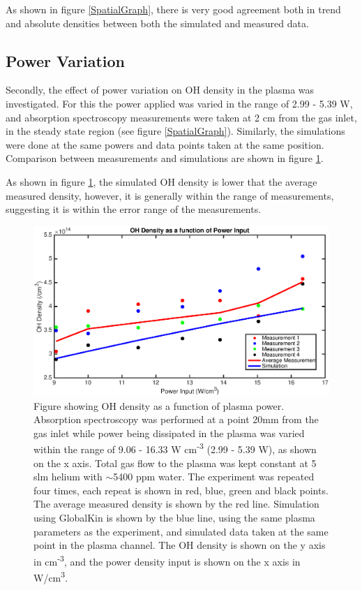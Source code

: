 \documentclass[11pt, oneside]{article}   	%
\begin{document}
As shown in figure \ref{SpatialGraph}, there is very good agreement both in trend and absolute densities between both the simulated and measured data.

\subsection{Power Variation}

Secondly, the effect of power variation on OH density in the plasma was investigated.
For this the power applied was varied in the range of 2.99 - 5.39 W, and absorption spectroscopy measurements were taken at 2 cm from the gas inlet, in the steady state region (see figure \ref{SpatialGraph}).
Similarly, the simulations were done at the same powers and data points taken at the same position.
Comparison between measurements and simulations are shown in figure \ref{PowerVariation}.

As shown in figure \ref{PowerVariation}, the simulated OH density is lower that the average measured density, however, it is generally within the range of measurements, suggesting it is within the error range of the measurements.

\begin{figure}
\includegraphics[width=\textwidth]{Figures/PowerVariation}
\caption{Figure showing OH density as a function of plasma power. Absorption spectroscopy was performed at a point 20mm from the gas inlet while power being dissipated in the plasma was varied within the range of 9.06 - 16.33 W cm\textsuperscript{-3} (2.99 - 5.39 W), as shown on the x axis. Total gas flow to the plasma was kept constant at 5 slm helium with $\sim$5400 ppm water. The experiment was repeated four times, each repeat is shown in red, blue, green and black points. The average measured density is shown by the red line.
Simulation using GlobalKin is shown by the blue line, using the same plasma parameters as the experiment, and simulated data taken at the same point in the plasma channel.
The OH density is shown on the y axis in cm\textsuperscript{-3}, and the power density input is shown on the x axis in W/cm\textsuperscript{3}.}
\label{PowerVariation}
\end{figure}
\end{document}
